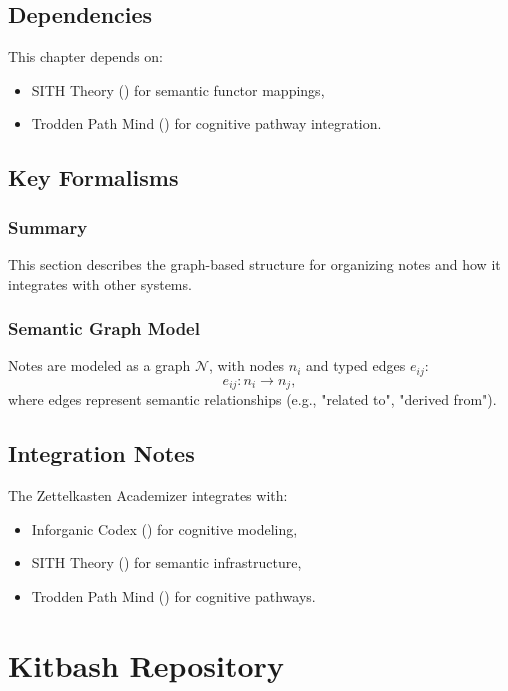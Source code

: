 \documentclass[11pt,oneside]{memoir}
\theoremstyle{plain}
\begin{document}
\section{Dependencies}
This chapter depends on:
\begin{itemize}
    \item SITH Theory () for semantic functor mappings,
    \item Trodden Path Mind () for cognitive pathway integration.
\end{itemize}

\section{Key Formalisms}
\subsection{Summary}
This section describes the graph-based structure for organizing notes and how it integrates with other systems.

\subsection{Semantic Graph Model}
Notes are modeled as a graph \(\mathcal{N}\), with nodes \(n_i\) and typed edges \(e_{ij}\):
\begin{equation}
    e_{ij} : n_i \to n_j,
\end{equation}
where edges represent semantic relationships (e.g., "related to", "derived from").

\section{Integration Notes}
The Zettelkasten Academizer integrates with:
\begin{itemize}
    \item Inforganic Codex () for cognitive modeling,
    \item SITH Theory () for semantic infrastructure,
    \item Trodden Path Mind () for cognitive pathways.
\end{itemize}

\chapter{Kitbash Repository}
\label{sec:kitbash}
\end{document}
